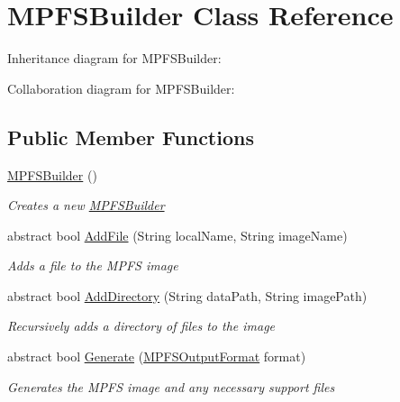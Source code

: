 \hypertarget{class_microchip_1_1_m_p_f_s_builder}{}\section{M\+P\+F\+S\+Builder Class Reference}
\label{class_microchip_1_1_m_p_f_s_builder}


Inheritance diagram for M\+P\+F\+S\+Builder\+:


Collaboration diagram for M\+P\+F\+S\+Builder\+:
\subsection*{Public Member Functions}
\begin{DoxyCompactItemize}
\item 
\hyperlink{class_microchip_1_1_m_p_f_s_builder_a73304519d4d0da7e8f5b32a87344f150}{M\+P\+F\+S\+Builder} ()
\begin{DoxyCompactList}\small\item\em Creates a new \hyperlink{class_microchip_1_1_m_p_f_s_builder}{M\+P\+F\+S\+Builder} \end{DoxyCompactList}\item 
abstract bool \hyperlink{class_microchip_1_1_m_p_f_s_builder_ad20e3945d7451ee3ca6909ce34780774}{Add\+File} (String local\+Name, String image\+Name)
\begin{DoxyCompactList}\small\item\em Adds a file to the M\+P\+F\+S image \end{DoxyCompactList}\item 
abstract bool \hyperlink{class_microchip_1_1_m_p_f_s_builder_a900413fb1fb5bba441654920de06b81d}{Add\+Directory} (String data\+Path, String image\+Path)
\begin{DoxyCompactList}\small\item\em Recursively adds a directory of files to the image \end{DoxyCompactList}\item 
abstract bool \hyperlink{class_microchip_1_1_m_p_f_s_builder_a287235d1a30bc3bb959b1c3b38fb154a}{Generate} (\hyperlink{namespace_microchip_aa4ebbf0f9a9e92e601f6a9aac07b5e1e}{M\+P\+F\+S\+Output\+Format} format)
\begin{DoxyCompactList}\small\item\em Generates the M\+P\+F\+S image and any necessary support files \end{DoxyCompactList}\end{DoxyCompactItemize}
